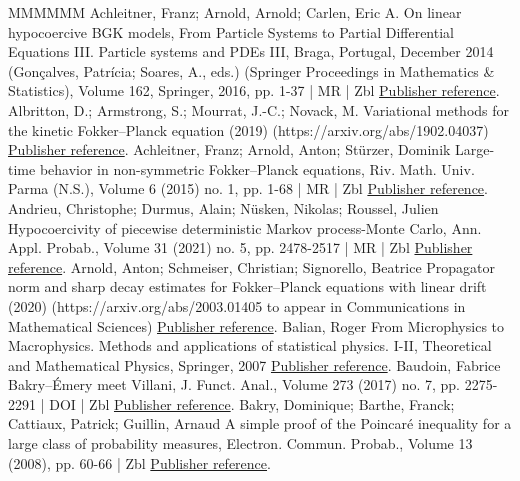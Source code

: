 \begin{thebibliography}{MMMMMM}
 Achleitner, Franz; Arnold, Arnold; Carlen, Eric A. On linear hypocoercive BGK models, From Particle Systems to Partial Differential Equations III. Particle systems and PDEs III, Braga, Portugal, December 2014 (Gonçalves, Patrícia; Soares, A., eds.) (Springer Proceedings in Mathematics \& Statistics), Volume 162, Springer, 2016, pp. 1-37 | MR | Zbl \href{https://ahl.centre-mersenne.org/item/AHL_2022__5__523_0/#AAC16}{Publisher reference}.
 Albritton, D.; Armstrong, S.; Mourrat, J.-C.; Novack, M. Variational methods for the kinetic Fokker–Planck equation (2019) (https://arxiv.org/abs/1902.04037) \href{https://ahl.centre-mersenne.org/item/AHL_2022__5__523_0/#AM19}{Publisher reference}.
 Achleitner, Franz; Arnold, Anton; Stürzer, Dominik Large-time behavior in non-symmetric Fokker–Planck equations, Riv. Math. Univ. Parma (N.S.), Volume 6 (2015) no. 1, pp. 1-68 | MR | Zbl \href{https://ahl.centre-mersenne.org/item/AHL_2022__5__523_0/#AAS15}{Publisher reference}.
 Andrieu, Christophe; Durmus, Alain; Nüsken, Nikolas; Roussel, Julien Hypocoercivity of piecewise deterministic Markov process-Monte Carlo, Ann. Appl. Probab., Volume 31 (2021) no. 5, pp. 2478-2517 | MR | Zbl \href{https://ahl.centre-mersenne.org/item/AHL_2022__5__523_0/#ADNR18}{Publisher reference}.
 Arnold, Anton; Schmeiser, Christian; Signorello, Beatrice Propagator norm and sharp decay estimates for Fokker–Planck equations with linear drift (2020) (https://arxiv.org/abs/2003.01405 to appear in Communications in Mathematical Sciences) \href{https://ahl.centre-mersenne.org/item/AHL_2022__5__523_0/#ASS20}{Publisher reference}.
 Balian, Roger From Microphysics to Macrophysics. Methods and applications of statistical physics. I-II, Theoretical and Mathematical Physics, Springer, 2007 \href{https://ahl.centre-mersenne.org/item/AHL_2022__5__523_0/#Balian}{Publisher reference}.
 Baudoin, Fabrice Bakry–Émery meet Villani, J. Funct. Anal., Volume 273 (2017) no. 7, pp. 2275-2291 | DOI | Zbl \href{https://ahl.centre-mersenne.org/item/AHL_2022__5__523_0/#Baudoin17}{Publisher reference}.
 Bakry, Dominique; Barthe, Franck; Cattiaux, Patrick; Guillin, Arnaud A simple proof of the Poincaré inequality for a large class of probability measures, Electron. Commun. Probab., Volume 13 (2008), pp. 60-66 | Zbl \href{https://ahl.centre-mersenne.org/item/AHL_2022__5__523_0/#BBCG}{Publisher reference}.

\end{thebibliography}
